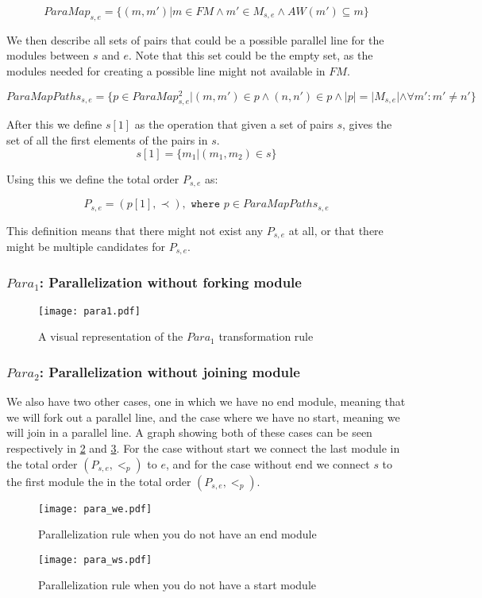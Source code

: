 \[ParaMap_{s, e} = \{(m, m')| m \in FM \land m' \in M_{s,e} \land AW(m') \subseteq m\} \]

We then describe all sets of pairs that could be a possible parallel line for the modules between $s$ and $e$. Note that this set could be the empty set, as the modules needed for creating a possible line might not available in $FM$.

\[ParaMapPaths_{s,e} = \{p \in ParaMap_{s,e}^2 | (m,m') \in p \land (n,n') \in p \land |p| = |M_{s,e}| \land  \forall m': m' \neq n' \}\]

After this we define $s[1]$ as the operation that given a set of pairs $s$, gives the set of all the first elements of the pairs in $s$.
\[s[1] = \{m_1 | (m_1, m_2) \in s\}\]

Using this we define the total order $P_{s,e}$ as:

\[ P_{s,e} = (p[1], \prec), \texttt{ where } p \in ParaMapPaths_{s,e} \]

This definition means that there might not exist any $P_{s,e}$ at all, or that there might be multiple candidates for $P_{s,e}$.

\subsubsection{$Para_1$: Parallelization without forking module}

\begin{figure}[H]
	\centering
	\texttt{[image: para1.pdf]}
	\caption{A visual representation of the $Para_1$ transformation rule}
	\label{fig:para1}
\end{figure}

\subsubsection{$Para_2$: Parallelization without joining module}


We also have two other cases, one in which we have no end module, meaning that we will fork out a parallel line, and the case where we have no start, meaning we will join in a parallel line. A graph showing both of these cases can be seen respectively in \cref{fig:para_we} and \cref{fig:para_ws}. For the case without start we connect the last module in the total order $(P_{s,e}, <_p)$ to $e$, and for the case without end we connect $s$ to the first module the in the total order $(P_{s,e}, <_p)$.


\begin{figure}[h]
\centering
\texttt{[image: para\_we.pdf]}
\caption{Parallelization rule when you do not have an end module}
\label{fig:para_we}
\end{figure}

\begin{figure}[h]
\centering
\texttt{[image: para\_ws.pdf]}
\caption{Parallelization rule when you do not have a start module}
\label{fig:para_ws}
\end{figure}

